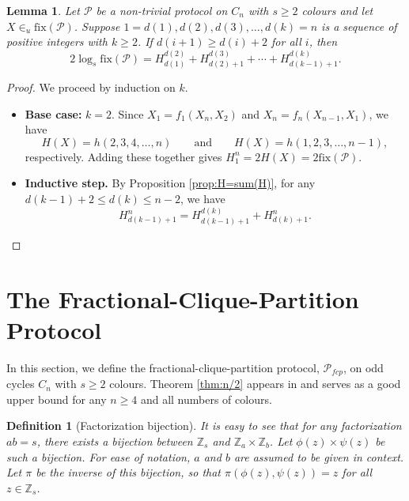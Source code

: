 \documentclass{birkjour}
\newtheorem{lem}[thm]{Lemma}
\theoremstyle{indenteddefinition}
\newtheorem{defn}[thm]{Definition}
\theoremstyle{indenteddefinition}
\numberwithin{equation}{section}
\renewcommand{\Pr}{\mathcal{P}}
\newcommand{\Z}{\mathbb{Z}}
\newcommand{\fix}{\mbox{fix}}
\begin{document}
\begin{lem}
\label{lem:H(X)=sum(H)}
Let $\Pr$ be a non-trivial protocol on $C_n$ with $s \geq 2$ colours and let $X\in_u \fix(\Pr)$. Suppose $1 = d(1),d(2),d(3), \ldots ,d(k) = n$ is a sequence of positive integers with $k \geq 2$. If $d(i+1) \geq d(i)+2$ for all $i$, then 
	$$ 2\log_s\fix(\Pr) = H_{d(1)}^{d(2)} + H_{d(2)+1}^{d(3)} + \cdots + H_{d(k-1)+1}^{d(k)}. $$
\end{lem}
\begin{proof} 
We proceed by induction on $k$. 
\begin{itemize}
\item {\bf Base case:} $k=2$. Since $X_1 = f_1(X_n,X_2)$ and $X_n = f_n(X_{n-1},X_1)$, we have 
	$$ H(X) = h(2,3,4, \ldots ,n) \qquad \mbox{and} \qquad H(X) = h(1,2,3, \ldots ,n-1) ,$$
respectively. Adding these together gives $H_1^n = 2H(X) = 2\fix(\Pr)$.
\item {\bf Inductive step.} By Proposition \ref{prop:H=sum(H)}, for any $d(k-1)+2 \leq d(k) \leq n-2$, we have 
	$$ H_{d(k-1)+1}^{n} = H_{d(k-1)+1}^{d(k)} + H_{d(k)+1}^{n}. $$
\end{itemize}
\end{proof}







\section{The Fractional-Clique-Partition Protocol}
\label{sec:frac}







In this section, we define the fractional-clique-partition protocol, $\Pr_{fcp}$, on odd cycles $C_n$ with $s\geq 2$ colours. Theorem \ref{thm:n/2} appears in \cite{Christofides2011guessing} and serves as a good upper bound for any $n \geq 4$ and all numbers of colours. 

\begin{defn}[Factorization bijection]
\label{defn:phi_and_psi}
It is easy to see that for any factorization $ab=s$, there exists a bijection between $\Z_s$ and $\Z_a \times \Z_b$. Let $\phi(z) \times \psi(z)$ be such a bijection. For ease of notation, $a$ and $b$ are assumed to be given in context. Let $\pi$ be the inverse of this bijection, so that $\pi(\phi(z),\psi(z))=z$ for all $z \in \Z_s$. 
\end{defn}
\end{document}
